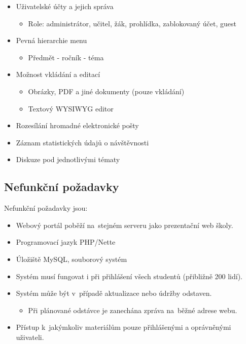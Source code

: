 \documentclass[thesis=B,czech]{FITthesis}[2012/06/26]
\begin{document}
\begin{itemize}

	\item Uživatelské účty a jejich správa
	\begin{itemize}
		\item Role: administrátor, učitel, žák, prohlídka, zablokovaný účet, guest
	\end{itemize}

	\item Pevná hierarchie menu
	\begin{itemize}
		\item Předmět - ročník - téma
	\end{itemize}
	
	\item Možnost vkládání a editací
	\begin{itemize}
		\item Obrázky, PDF a jiné dokumenty (pouze vkládání)
		\item Textový WYSIWYG editor
	\end{itemize}

	\item Rozesílání hromadné elektronické pošty
	\item Záznam statistických údajů o návštěvnosti
	\item Diskuze pod jednotlivými tématy
\end{itemize}

\subsection{Nefunkční požadavky}

Nefunkční požadavky jsou:

\begin{itemize}

	\item Webový portál poběží na~stejném serveru jako prezentační web školy.
	\item Programovací jazyk PHP/Nette
	\item Úložiště MySQL, souborový systém
	\item Systém musí fungovat i při přihlášení všech studentů (přibližně 200 lidí).
	\item Systém může být v~případě aktualizace nebo údržby odstaven.
	\begin{itemize}
		\item Při plánované odstávce je zanechána zpráva na~běžné adrese webu.
	\end{itemize}	
	\item Přístup k~jakýmkoliv materiálům pouze přihlášenými a oprávněnými uživateli.

\end{itemize}
\end{document}
